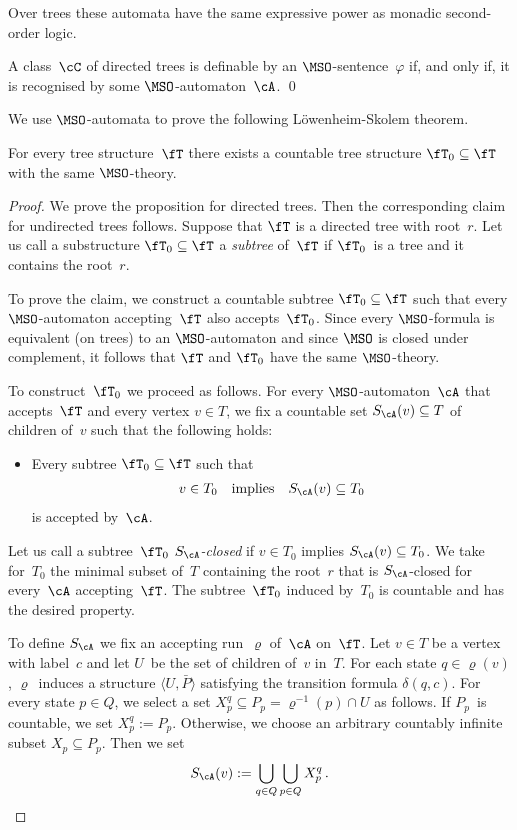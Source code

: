 \documentclass{LMCS}
\begin{document}
Over trees these automata have the same expressive power as monadic second-order logic.
\begin{thm}
A class~$\cC$ of directed trees is definable
by an $\MSO$-sentence~$\varphi$ if, and only if,
it is recognised by some $\MSO$-automaton~$\cA$.
\qed\end{thm}

We use $\MSO$-automata to prove the following L\"owenheim-Skolem theorem.
\begin{prop}\label{prop:Loewenheim-Skolem for trees}
For every tree structure~$\fT$ there exists a countable tree structure $\fT_0 \subseteq \fT$
with the same $\MSO$-theory.
\end{prop}
\begin{proof}
We prove the proposition for directed trees.
Then the corresponding claim for undirected trees follows.
Suppose that $\fT$ is a directed tree with root~$r$.
Let us call a substructure $\fT_0 \subseteq \fT$ a
\emph{subtree} of~$\fT$ if $\fT_0$~is a tree and it contains the root~$r$.

To prove the claim, we construct a countable subtree $\fT_0 \subseteq \fT$
such that every $\MSO$-automaton accepting~$\fT$ also accepts~$\fT_0$.
Since every $\MSO$-formula is equivalent (on trees) to an $\MSO$-automaton
and since $\MSO$ is closed under complement, it follows that
$\fT$ and $\fT_0$ have the same $\MSO$-theory.

To construct~$\fT_0$ we proceed as follows.
For every $\MSO$-automaton~$\cA$ that accepts~$\fT$ and every vertex
$v \in T$, we fix a countable set $S_\cA(v) \subseteq T$ of children of~$v$
such that the following holds\?:
\begin{itemize}[label=$(*)$]
\item Every subtree $\fT_0 \subseteq \fT$ such that
  \begin{align*}
    v \in T_0 \quad\text{implies}\quad S_\cA(v) \subseteq T_0
  \end{align*}
  is accepted by~$\cA$.
\end{itemize}
Let us call a subtree~$\fT_0$ \emph{$S_\cA$-closed} if
$v \in T_0$ implies $S_\cA(v) \subseteq T_0$.
We take for~$T_0$ the minimal subset of~$T$ containing
the root~$r$ that is $S_\cA$-closed for every~$\cA$ accepting~$\fT$.
The subtree~$\fT_0$ induced by~$T_0$ is countable and has the desired property.

To define $S_\cA$ we fix an accepting run~$\varrho$ of~$\cA$ on~$\fT$.
Let $v \in T$ be a vertex with label~$c$ and let $U$~be the set of children
of~$v$ in~$T$.
For each state $q \in \varrho(v)$, $\varrho$~induces a structure $\langle U,\bar P\rangle$
satisfying the transition formula $\delta(q,c)$.
For every state $p \in Q$, we select a set $X^q_p \subseteq P_p = \varrho^{-1}(p) \cap U$ as follows.
If $P_p$~is countable, we set $X^q_p := P_p$.
Otherwise, we choose an arbitrary countably infinite subset $X_p \subseteq P_p$.
Then we set
\begin{align*}
  S_\cA(v) := \bigcup_{q \in Q} \bigcup_{p \in Q} X^q_p\,.
\end{align*}


\end{proof}
\end{document}

